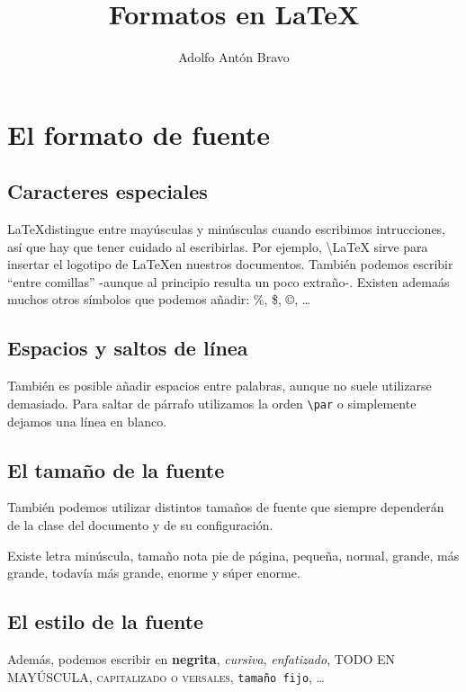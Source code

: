 \documentclass[11pt,twoside,a4paper]{article}
\begin{document}
\title{Formatos en \LaTeX}
\author{Adolfo Antón Bravo}
\maketitle{}
\section{El formato de fuente}
\label{sec:formato}

\subsection{Caracteres especiales}
\label{sec:caracteres}
\LaTeX distingue entre mayúsculas y minúsculas cuando escribimos intrucciones, así que hay que tener cuidado al escribirlas. Por ejemplo, \textbackslash LaTeX sirve para insertar el logotipo de \LaTeX en nuestros documentos.
También podemos escribir ``entre comillas'' -aunque al principio resulta un poco extraño-. Existen ademaás muchos otros símbolos que podemos añadir: \%, \$, \copyright, \ldots

\subsection{Espacios y saltos de línea}
\label{sec:espacioslinea}

También es posible añadir espacios \hspace{2cm} entre palabras, aunque no suele utilizarse demasiado.
Para saltar de párrafo utilizamos la orden \texttt{\textbackslash par} o simplemente dejamos una línea en blanco.

\subsection{El tamaño de la fuente}
\label{sec:fuente}

También podemos utilizar distintos tamaños de fuente que siempre dependerán de la clase del documento y de su configuración.

Existe letra \tiny minúscula, \scriptsize tamaño nota \footnotesize pie de página, \small pequeña, \normalsize normal, \large grande, \Large más grande, \LARGE todavía más grande, \huge enorme y \Huge súper enorme. 

\subsection{El estilo de la fuente}
\label{sec:estilo}
\normalsize
Además, podemos escribir en \textbf{negrita}, \textit{cursiva}, \emph{enfatizado}, \uppercase{todo en mayúscula}, \textsc{capitalizado o versales}, \texttt{tamaño fijo}, \ldots
\end{document}
